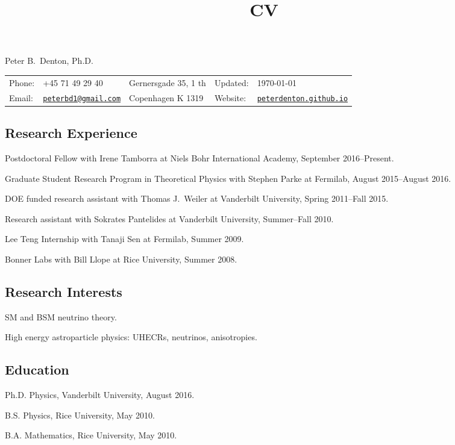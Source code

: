 \documentclass[letterpaper]{article}
\title{CV}
\newif\ifhtlatex
\def\name{Peter B.~Denton, Ph.D.}
\renewenvironment{itemize}{
\begin{list}{}{
\setlength{\leftmargin}{1.5em}
}
}{
\end{list}
}
\begin{document}
\ifhtlatex
\Tag{TITLE+}{CV}
\fi

{\huge \name}

\vspace{0.1in}

\begin{tabular}{ll|l|ll}
Phone: & +45 71 49 29 40 & Gernersgade 35, 1 th & Updated: & \today\\
Email: & \href{mailto:peterbd1@gmail.com}{\tt peterbd1@gmail.com} & Copenhagen K 1319 & Website: & 
\href{http://peterdenton.github.io}{\tt peterdenton.github.io}
\end{tabular}

\subsection*{Research Experience}
\begin{itemize}
\item Postdoctoral Fellow with Irene Tamborra at Niels Bohr International Academy, September 2016--Present.
\item Graduate Student Research Program in Theoretical Physics with Stephen Parke at Fermilab, August 2015--August 2016.
\item DOE funded research assistant with Thomas J.~Weiler at Vanderbilt University, Spring 2011--Fall 2015.
\item Research assistant with Sokrates Pantelides at Vanderbilt University, Summer--Fall 2010.
\item Lee Teng Internship with Tanaji Sen at Fermilab, Summer 2009.
\item Bonner Labs with Bill Llope at Rice University, Summer 2008.
\end{itemize}

\subsection*{Research Interests}
\begin{itemize}
\item SM and BSM neutrino theory.
\item High energy astroparticle physics: UHECRs, neutrinos, anisotropies.
\end{itemize}

\subsection*{Education}
\begin{itemize}
\item Ph.D. Physics, Vanderbilt University, August 2016.
\item B.S. Physics, Rice University, May 2010.
\item B.A. Mathematics, Rice University, May 2010.
\end{itemize}
\end{document}
